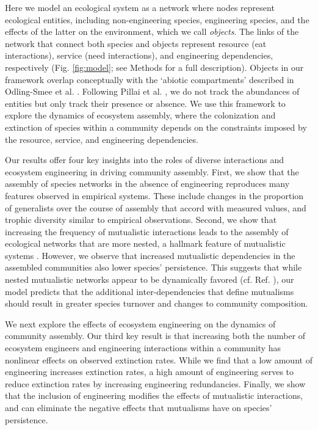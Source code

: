 \documentclass[9pt,twocolumn,twoside]{pnas-new}
\begin{document}
Here we model an ecological system as a network where nodes represent ecological entities, including non-engineering species, engineering species, and the effects of the latter on the environment, which we call \emph{objects}.
The links of the network that connect both species and objects represent resource (eat interactions), service (need interactions), and engineering dependencies, respectively (Fig. \ref{fig:model}; see Methods for a full description).
Objects in our framework overlap conceptually with the `abiotic compartments' described in Odling-Smee et al. \cite{OdlingSmee2013}.
Following Pillai et al. \cite{Pillai2011}, we do not track the abundances of entities but only track their presence or absence.
We use this framework to explore the dynamics of ecosystem assembly, where the colonization and extinction of species within a community depends on the constraints imposed by the resource, service, and engineering dependencies.

Our results offer four key insights into the roles of diverse interactions and ecosystem engineering in driving community assembly.
First, we show that the assembly of species networks in the absence of engineering reproduces many features observed in empirical systems.
These include changes in the proportion of generalists over the course of assembly that accord with measured values, and trophic diversity similar to empirical observations. %
Second, we show that increasing the frequency of mutualistic interactions leads to the assembly of ecological networks that are more nested, a hallmark feature of mutualistic systems \cite{Bascompte2003}.
However, we observe that increased mutualistic dependencies in the assembled communities also lower species' persistence.
This suggests that while nested mutualistic networks appear to be dynamically favored (cf. Ref. ), our model predicts that the additional inter-dependencies that define mutualisms should result in greater species turnover and changes to community composition.

We next explore the effects of ecosystem engineering on the dynamics of community assembly.
Our third key result is that increasing both the number of ecosystem engineers and engineering interactions within a community has nonlinear effects on observed extinction rates.
While we find that a low amount of engineering increases extinction rates, a high amount of engineering serves to reduce extinction rates by increasing engineering redundancies.
Finally, we show that the inclusion of engineering modifies the effects of mutualistic interactions, and can eliminate the negative effects that mutualisms have on species' persistence.\\
\end{document}
